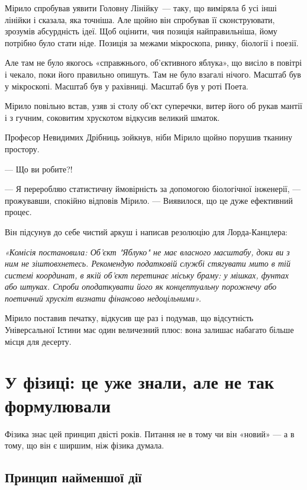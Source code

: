 \documentclass[12pt, a4paper, openany]{book}
\begin{document}
\begin{terrybox}
Мірило спробував уявити Головну Лінійку~--- таку, що виміряла б усі інші лінійки і сказала, яка точніша. Але щойно він спробував її сконструювати, зрозумів абсурдність ідеї. Щоб оцінити, чия позиція найправильніша, йому потрібно було стати ніде. Позиція за межами мікроскопа, ринку, біології і поезії.

Але там не було якогось «справжнього, об'єктивного яблука», що висіло в повітрі і чекало, поки його правильно опишуть. Там не було взагалі нічого. Масштаб був у мікроскопі. Масштаб був у рахівниці. Масштаб був у роті Поета.

\medskip
Мірило повільно встав, узяв зі столу об'єкт суперечки, витер його об рукав мантії і з гучним, соковитим хрускотом відкусив великий шматок.

Професор Невидимих Дрібниць зойкнув, ніби Мірило щойно порушив тканину простору.

--- Що ви робите?!

--- Я переробляю статистичну ймовірність за допомогою біологічної інженерії, --- прожувавши, спокійно відповів Мірило. --- Виявилося, що це дуже ефективний процес.

\medskip
Він підсунув до себе чистий аркуш і написав резолюцію для Лорда-Канцлера:

\medskip
\textit{«Комісія постановила: Об'єкт "Яблуко" не має власного масштабу, доки ви з ним не зіштовхнетесь. Рекомендую податковій службі стягувати мито в тій системі координат, в якій об'єкт перетинає міську браму: у мішках, фунтах або штуках. Спроби оподаткувати його як концептуальну порожнечу або поетичний хрускіт визнати фінансово недоцільними».}

\medskip
Мірило поставив печатку, відкусив ще раз і подумав, що відсутність Універсальної Істини має один величезний плюс: вона залишає набагато більше місця для десерту.
\end{terrybox}

\chapter{У фізиці: це уже знали, але не так формулювали}

Фізика знає цей принцип двісті років. Питання не в тому чи він «новий» --- а в тому, що він є ширшим, ніж фізика думала.

\section{Принцип найменшої дії}
\end{document}
